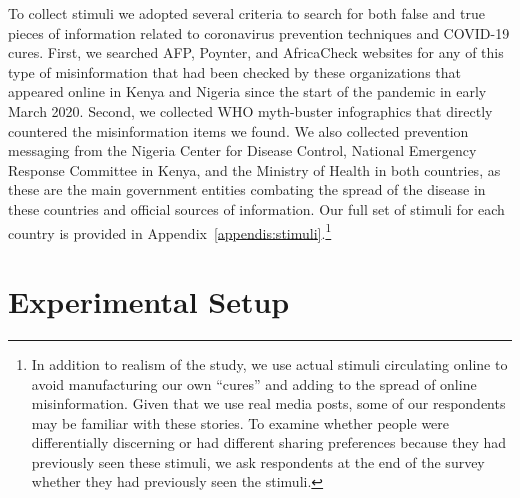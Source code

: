 \documentclass[letterpaper, 12pt, parskip=full,]{scrartcl}
\begin{document}
To collect stimuli we adopted several criteria to search for both false and true pieces of information related to coronavirus prevention techniques and COVID-19 cures. First, we searched AFP, Poynter, and AfricaCheck websites for any of this type of misinformation that had been checked by these organizations that appeared online in Kenya and Nigeria since the start of the pandemic in early March 2020. Second, we collected WHO myth-buster infographics that directly countered the misinformation items we found. We also collected prevention messaging from the Nigeria Center for Disease Control, National Emergency Response Committee in Kenya, and the Ministry of Health in both countries, as these are the main government entities combating the spread of the disease in these countries and official sources of information. Our full set of stimuli for each country is provided in Appendix~\ref{appendis:stimuli}.\footnote{In addition to realism of the study, we use actual stimuli circulating online to avoid manufacturing our own ``cures'' and adding to the spread of online misinformation. Given that we use real media posts, some of our respondents may be familiar with these stories. To examine whether people were differentially discerning \citep{nyhan2020facts} or had different sharing preferences because they had previously seen these stimuli, we ask respondents at the end of the survey whether they had previously seen the stimuli.}








\FloatBarrier
\section{Experimental Setup}
\end{document}
